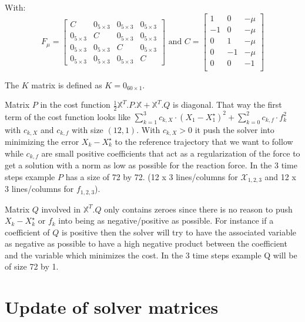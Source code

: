 \documentclass[a4paper,11pt]{article}
\begin{document}
With:
\begin{equation}
F_\mu = \begin{bmatrix} 
	C  & 0_{5\times3} & 0_{5\times3} & 0_{5\times3} \\
	0_{5\times3} & C & 0_{5\times3} & 0_{5\times3} \\
	0_{5\times3}  & 0_{5\times3} & C & 0_{5\times3} \\
	0_{5\times3}  & 0_{5\times3} & 0_{5\times3} & C
\end{bmatrix} \text{ and } C = \begin{bmatrix} 
1  & 0 & -\mu \\
-1 & 0 & -\mu \\
0  & 1 & -\mu \\
0  & -1 & -\mu \\
0  & 0 & - 1 \\
\end{bmatrix}
\end{equation}

The $K$ matrix is defined as $K = 0_{60 \times 1}$.

Matrix $P$ in the cost function $\frac{1}{2}\mathbb{X}^T.P.\mathbb{X} + \mathbb{X}^T.Q$ is diagonal. That way the first term of the cost function looks like $\sum_{k=1}^{3} c_{k,X} \cdot (X_1 - X_1^\star)^2 + \sum_{k=0}^{2} c_{k,f} \cdot f_k^2$ with $c_{k,X}$ and $c_{k,f}$ with size $(12, 1)$. With $c_{k,X} > 0$ it push the solver into minimizing the error $X_k - X_k^\star$ to the reference trajectory that we want to follow while $c_{k,f}$ are small positive coefficients that act as a regularization of the force to get a solution with a norm as low as possible for the reaction force. In the 3 time steps example $P$ has a size of 72 by 72. (12 x 3 lines/columns for $\mathcal{X}_{1,2,3}$ and 12 x 3 lines/columns for $f_{1,2,3}$).
 

Matrix $Q$ involved in $\mathbb{X}^T.Q$ only contains zeroes since there is no reason to push $X_k - X_k^\star$ or $f_k$ into being as negative/positive as possible. For instance if a coefficient of $Q$ is positive then the solver will try to have the associated variable as negative as possible to have a high negative product between the coefficient and the variable which minimizes the cost. In the 3 time steps example Q will be of size 72 by 1.

\section*{Update of solver matrices}
\end{document}
